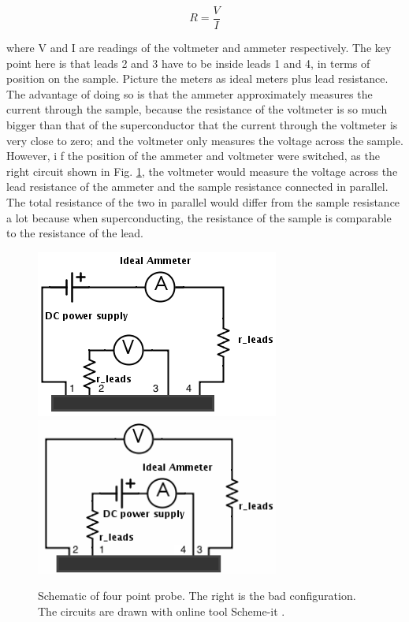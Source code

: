 \documentclass[prb,preprint]{revtex4-1}
\begin{document}
\begin{equation}
R=\frac{V}{I}
\label{ohm}
\end{equation}

where V and I are readings of the voltmeter and ammeter respectively. The key point here is that leads 2 and 3 have to be inside leads 1 and 4, in terms of position on the sample. Picture the meters as ideal meters plus lead resistance. The advantage of doing so is that the ammeter approximately measures the current through the sample, because the resistance of the voltmeter is so much bigger than that of the superconductor that the current through the voltmeter is very close to zero; and the voltmeter only measures the voltage across the sample. However, i f the position of the ammeter and voltmeter were switched, as the right circuit shown in Fig. \ref{fpp}, the voltmeter would measure the voltage across the lead resistance of the ammeter and the sample resistance connected in parallel. The total resistance of the two in parallel would differ from the sample resistance a lot because when superconducting, the resistance of the sample is comparable to the resistance of the lead. \\

\begin{figure}[h]
\centering
\includegraphics[width=8cm]{fourpointprobe2.png}
\includegraphics[width=8cm]{fourpointprobe3.png}
\caption{Schematic of four point probe. The right is the bad configuration. The circuits are drawn with online tool Scheme-it \cite{drawcircuit}.}
\label{fpp}
\end{figure}
\end{document}

